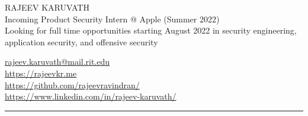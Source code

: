 \documentclass[letterpaper]{deedy-resume} %
\begin{document}

\begin{minipage}[t]{0.50\textwidth}

\begin{flushleft}
\Huge{}\uppercase{Rajeev Karuvath} \\
\sectionspace
\small{Incoming Product Security Intern @ Apple (Summer 2022)} \\
\sectionspace
{}\scriptsize{Looking for full time opportunities starting August 2022 in security engineering, application security, and offensive security}
\end{flushleft}

\end{minipage}
\begin{minipage}[t]{0.40\textwidth}
\begin{flushright}
\small
\href{mailto:rk3824@rit.edu}{rajeev.karuvath@mail.rit.edu}  \faEnvelope \\
\url{https://rajeevkr.me}  \faChrome \\
\url{https://github.com/rajeevravindran/}  \faGithub  \\
\url{https://www.linkedin.com/in/rajeev-karuvath/}  \faLinkedin  \\

\end{flushright}
\end{minipage}
\sectionspace
\begin{hline}
\noindent\rule{\textwidth}{1pt}
\end{hline}

\end{document}
